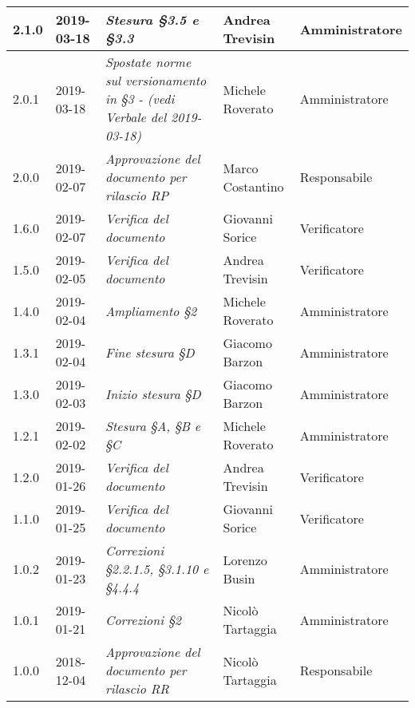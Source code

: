\begin{longtable}{C{2cm}|C{2.5cm}|C{4.5cm}|C{2.5cm}|C{3cm}}
		2.1.0 & 2019-03-18 & \emph{Stesura §3.5 e §3.3} & Andrea Trevisin & Amministratore \\
		\hline
		
		2.0.1 & 2019-03-18 & \emph{Spostate norme sul versionamento in §3 - (vedi Verbale del 2019-03-18)} & Michele Roverato & Amministratore \\
		\hline
		
		2.0.0 & 2019-02-07 & \emph{Approvazione del documento per rilascio RP} & Marco Costantino & Responsabile \\
		\hline
		
		1.6.0 & 2019-02-07 & \emph{Verifica del documento}  & Giovanni Sorice & Verificatore  \\
		\hline
		
		1.5.0 & 2019-02-05 & \emph{Verifica del documento} & Andrea Trevisin & Verificatore  \\
		\hline
		
		1.4.0 & 2019-02-04 & \emph{Ampliamento §2} & Michele Roverato & Amministratore  \\
		\hline
		
		 1.3.1 & 2019-02-04 & \emph{Fine stesura §D} & Giacomo Barzon & Amministratore \\
		\hline
		
		1.3.0 & 2019-02-03 & \emph{Inizio stesura §D} & Giacomo Barzon & Amministratore  \\
		\hline
		
		1.2.1 & 2019-02-02 & \emph{Stesura §A, §B e §C} & Michele Roverato & Amministratore  \\
		\hline
		
		1.2.0 & 2019-01-26 & \emph{Verifica del documento} & Andrea Trevisin & Verificatore  \\
		\hline
		
		1.1.0 & 2019-01-25 & \emph{Verifica del documento} & Giovanni Sorice & Verificatore  \\
		\hline
		
		1.0.2 & 2019-01-23 & \emph{Correzioni §2.2.1.5, §3.1.10 e §4.4.4} & Lorenzo Busin & Amministratore \\
		\hline
		
		1.0.1 & 2019-01-21 & \emph{Correzioni §2} & Nicolò Tartaggia & Amministratore  \\
		\hline
		
		1.0.0  & 2018-12-04 & \emph{Approvazione del documento per rilascio RR} & Nicolò Tartaggia & Responsabile \\
		\hline
		

\end{longtable}
